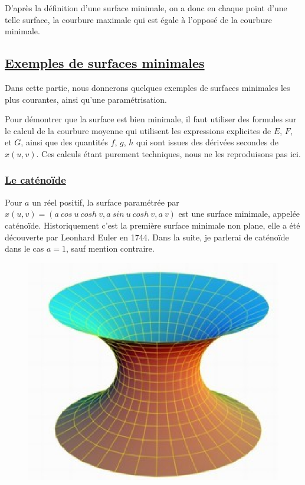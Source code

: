 \documentclass {report}
\begin{document}
D'après la définition d'une surface minimale, on a donc en chaque point d'une telle surface, la courbure maximale qui est égale à l'opposé de la courbure minimale. 

\subsection[Exemples de surfaces minimales]{\uline{Exemples de surfaces minimales}}

Dans cette partie, nous donnerons quelques exemples de surfaces minimales les plus courantes, ainsi qu'une paramétrisation. 

Pour démontrer que la surface est bien minimale, il faut utiliser des formules sur le calcul de la courbure moyenne qui utilisent les expressions explicites de $E$, $F$, et $G$, ainsi que des quantités $f$, $g$, $h$ qui sont issues des dérivées secondes de $x(u,v)$. Ces calculs étant purement techniques, nous ne les reproduisons pas ici.

\subsubsection[Le caténoïde]{\uline{Le caténoïde}}

Pour $a$ un réel positif, la surface paramétrée par $x(u,v) = (a\ cos\ u\ cosh\ v, a\ sin\ u\ cosh\ v, a\ v)$ est une surface minimale, appelée caténoïde. Historiquement c'est la première surface minimale non plane, elle a été découverte par Leonhard Euler en 1744. Dans la suite, je parlerai de caténoïde dans le cas $a=1$, sauf mention contraire.

\begin{figure}[h!]
      \centering 
      \includegraphics[scale=0.5]{Images_Fichiers/3.eps}
\end{figure}
\end{document}
